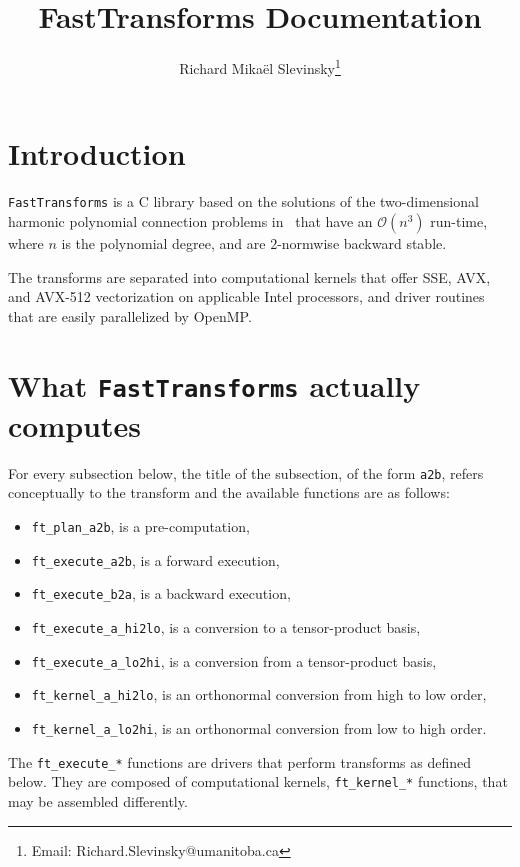 \documentclass{article}
\begin{document}
\title{FastTransforms Documentation}

\author{Richard Mika\"el Slevinsky\thanks{Email: Richard.Slevinsky@umanitoba.ca}}

\maketitle

\section{Introduction}

{\tt FastTransforms} is a C library based on the solutions of the two-dimensional harmonic polynomial connection problems in~\cite{Slevinsky-ACHA-17,Slevinsky-1711-07866} that have an $\mathcal{O}(n^3)$ run-time, where $n$ is the polynomial degree, and are $2$-normwise backward stable.

The transforms are separated into computational kernels that offer SSE, AVX, and AVX-512 vectorization on applicable Intel processors, and driver routines that are easily parallelized by OpenMP.

\section{What {\tt FastTransforms} actually computes}

For every subsection below, the title of the subsection, of the form \verb+a2b+, refers conceptually to the transform and the available functions are as follows:
\begin{itemize}
\item \verb+ft_plan_a2b+, is a pre-computation,
\item \verb+ft_execute_a2b+, is a forward execution,
\item \verb+ft_execute_b2a+, is a backward execution,
\item \verb+ft_execute_a_hi2lo+, is a conversion to a tensor-product basis,
\item \verb+ft_execute_a_lo2hi+, is a conversion from a tensor-product basis,
\item \verb+ft_kernel_a_hi2lo+, is an orthonormal conversion from high to low order,
\item \verb+ft_kernel_a_lo2hi+, is an orthonormal conversion from low to high order.
\end{itemize}
The \verb+ft_execute_*+ functions are drivers that perform transforms as defined below. They are composed of computational kernels, \verb+ft_kernel_*+ functions, that may be assembled differently.
\end{document}
